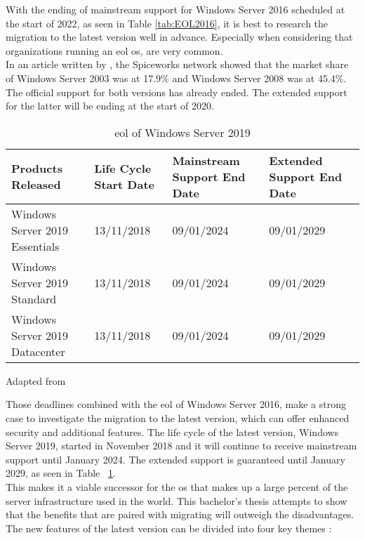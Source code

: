 With the ending of mainstream support for Windows Server 2016 scheduled at the start of 2022, as seen in Table \ref{tab:EOL2016}, it is best to research the migration to the latest version well in advance. 
Especially when considering that organizations running an \acrfull{eol} \acrshort{os}, are very common. \\
In an article written by \textcite{Tsai2016}, the Spiceworks network showed that the market share of Windows Server 2003 was at 17.9\% and Windows Server 2008 was at 45.4\%. 
The official support for both versions has already ended. The extended support for the latter will be ending at the start of 2020. 

\begin{table}[ht]
	\centering
	\begin{adjustbox}{width=1\textwidth}
		\begin{tabular}{l|l|l|ll}
			Products Released & Life Cycle Start Date & Mainstream Support End Date & Extended Support End Date &\\
			\hline
			Windows Server 2019 Essentials & 13/11/2018 & 09/01/2024 & 09/01/2029 &\\
			Windows Server 2019 Standard & 13/11/2018 & 09/01/2024 & 09/01/2029 &\\
			Windows Server 2019 Datacenter & 13/11/2018 & 09/01/2024 & 09/01/2029 &\\
		\end{tabular}
	\end{adjustbox}
	\caption[\acrshort{eol} Windows Server 2019]{\acrshort{eol} of Windows Server 2019}
	\scriptsize	
	Adapted from \cite{MicrosoftEOL2019}
	\label{tab:EOL2019}
\end{table}

Those deadlines combined with the \acrshort{eol} of Windows Server 2016, make a strong case to investigate the migration to the latest version, which can offer enhanced security and additional features. 
The life cycle of the latest version, Windows Server 2019, started in November 2018 and it will continue to receive mainstream support until January 2024. 
The extended support is guaranteed until January 2029, as seen in Table ~\ref{tab:EOL2019}.\\
This makes it a viable successor for the \acrshort{os} that makes up a large percent of the server infrastructure used in the world. 
This bachelor's thesis attempts to show that the benefits that are paired with migrating will outweigh the disadvantages. 
The new features of the latest version can be divided into four key themes \autocite{MWST2018}:

